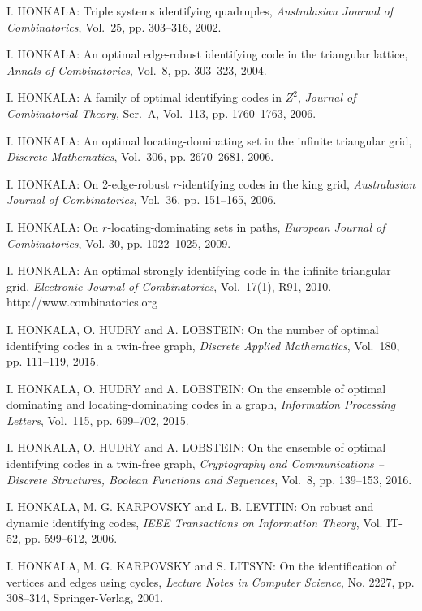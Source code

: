 \begin{thebibliography}{999}
I. HONKALA: Triple systems identifying quadruples, {\it Australasian Journal of Combinatorics}, Vol.~25, pp. 303--316, 2002.

I. HONKALA: An optimal edge-robust identifying code in the triangular lattice, {\it Annals of Combinatorics}, Vol.~8, pp. 303--323, 2004.

I. HONKALA: A family of optimal identifying codes in $Z^2$, {\it Journal of Combinatorial Theory}, Ser.~A, Vol.~113, pp. 1760--1763, 2006.

I. HONKALA: An optimal locating-dominating set in the infinite triangular grid, {\it Discrete Mathematics}, Vol.~306, pp. 2670--2681, 2006.

I. HONKALA: On 2-edge-robust $r$-identifying codes in the king grid, {\it Australasian Journal of Combinatorics}, Vol.~36, pp. 151--165, 2006.

I. HONKALA: On $r$-locating-dominating sets in paths, {\it European Journal of Combinatorics}, Vol. 30, pp. 1022--1025, 2009. 

I. HONKALA: An optimal strongly identifying code in the infinite triangular grid, {\it Electronic Journal of Combinatorics}, Vol.~17(1), R91, 2010.\\
http://www.combinatorics.org

 I. HONKALA, O. HUDRY and A. LOBSTEIN: On the number of optimal identifying codes in a twin-free graph, {\it Discrete Applied Mathematics}, Vol.~180, pp. 111--119, 2015.

 I. HONKALA, O. HUDRY and A. LOBSTEIN: On the ensemble of optimal dominating and locating-dominating codes in a graph, {\it Information Processing Letters}, Vol.~115, pp. 699--702, 2015.

 I. HONKALA, O. HUDRY and A. LOBSTEIN: On the ensemble of optimal identifying codes in a twin-free graph, {\it Cryptography and Communications -- Discrete Structures, Boolean Functions and Sequences}, Vol.~8, pp. 139--153, 2016.

I. HONKALA, M. G. KARPOVSKY and L. B. LEVITIN: On robust and dynamic identifying codes, {\it IEEE Transactions on Information Theory}, Vol. IT-52, pp. 599--612, 2006.

I. HONKALA, M. G. KARPOVSKY and S. LITSYN: On the identification of vertices and edges using cycles, {\it Lecture Notes in Computer Science}, No. 2227, pp. 308--314, Springer-Verlag, 2001.


\end{thebibliography}
